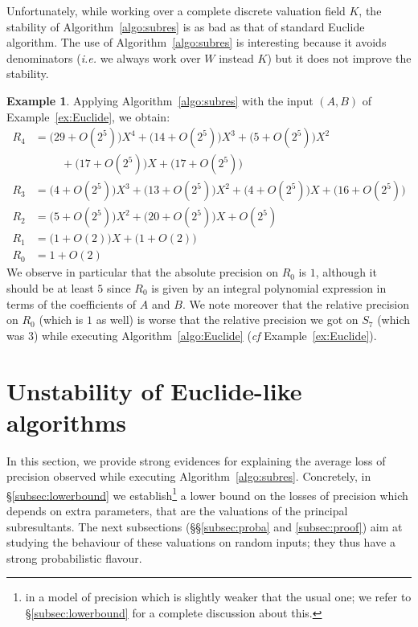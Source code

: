 \documentclass{jT}
\numberwithin{equation}{section}
\theoremstyle{definition}
\newtheorem{ex}[theo]{Example}
\newcommand{\A}{W}
\begin{document}
Unfortunately, while working over a complete discrete valuation field 
$K$, the stability of Algorithm~\ref{algo:subres} is as bad as that of 
standard Euclide algorithm. The use of Algorithm~\ref{algo:subres} is 
interesting because it avoids denominators (\emph{i.e.} we always work 
over $\A$ instead $K$) but it does not improve the stability.

\begin{ex}
\label{ex:subres}
Applying Algorithm~\ref{algo:subres} with the input $(A,B)$ of 
Example~\ref{ex:Euclide}, we obtain:
\begin{align*}
R_4 & = 
  \big(29 + O(2^5)\big) X^4 + 
  \big(14 + O(2^5)\big) X^3 + 
  \big(5 + O(2^5)\big) X^2 \\
& \hspace{1cm} + 
  \big(17 + O(2^5)\big) X + 
  \big(17 + O(2^5)\big) \\
R_3 & = 
  \big(4 + O(2^5)\big) X^3 + 
  \big(13 + O(2^5)\big) X^2 + 
  \big(4 + O(2^5)\big) X + 
  \big(16 + O(2^5)\big) \\
R_2 & = 
  \big(5 + O(2^5)\big) X^2 + 
  \big(20 + O(2^5)\big) X + 
  O(2^5) \\
R_1 & = 
  \big(1 + O(2)\big) X + 
  \big(1 + O(2)\big) \\
R_0 & = 1 + O(2)
\end{align*}
We observe in particular that the absolute precision on $R_0$ is $1$, 
although it should be at least $5$ since $R_0$ is given by an integral
polynomial expression in terms of the coefficients of $A$ and $B$. We
note moreover that the relative precision on $R_0$ (which is $1$ as
well) is worse that the relative precision we got on $S_7$ (which was
$3$) while executing Algorithm~\ref{algo:Euclide} (\emph{cf} 
Example~\ref{ex:Euclide}).
\end{ex}

\section{Unstability of Euclide-like algorithms}
\label{sec:unstable}

In this section, we provide strong evidences for explaining the average 
loss of precision observed while executing Algorithm~\ref{algo:subres}.
Concretely, in \S \ref{subsec:lowerbound} we establish\footnote{in a 
model of precision which is slightly weaker that the usual one; we refer 
to \S \ref{subsec:lowerbound} for a complete discussion about this.} a 
lower bound on the losses of precision which depends on extra 
parameters, that are the valuations of the principal subresultants. 
The next subsections (\S\S \ref{subsec:proba} and \ref{subsec:proof})
aim at studying the behaviour of these valuations on random inputs;
they thus have a strong probabilistic flavour.
\end{document}

